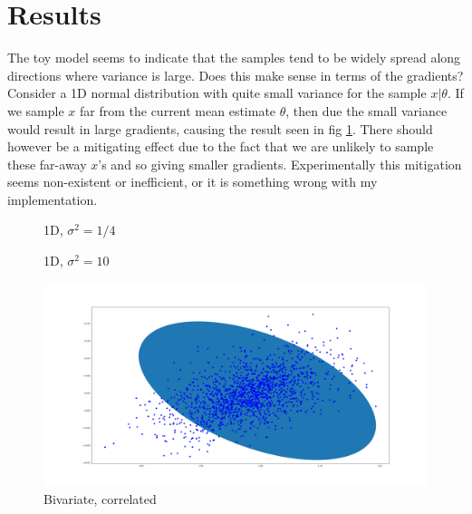 \section{Results}

The toy model seems to indicate that the samples tend to be widely spread along directions where variance is large.
Does this make sense in terms of the gradients?
Consider a 1D normal distribution with quite small variance for the sample $x| \theta$.
If we sample $x$ far from the current mean estimate $\theta$, then due the small variance would result in large gradients, causing the result seen in fig \ref{fig:1d_low_var}. There should however be a mitigating effect due to the fact that we are unlikely to sample these far-away $x$'s and so giving smaller gradients. Experimentally this mitigation seems non-existent or inefficient, or it is something wrong with my implementation.  

\begin{figure}
  
  \caption{1D, $\sigma^2 = 1/4$}\label{fig:1d_low_var}
\end{figure}

\begin{figure}
  
  \caption{1D, $\sigma^2 = 10$}\label{fig:1d_high_var}
\end{figure}



\begin{figure}
  \includegraphics[width=\linewidth]{fig/mirrored_cov_1.png}
  \caption{Bivariate, correlated}\label{fig:mirrored_cov_1}
\end{figure}
